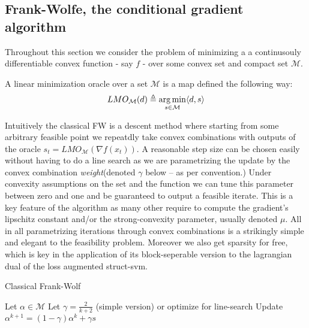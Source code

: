 \subsection{Frank-Wolfe, the conditional gradient algorithm}
Throughout this section we consider the problem of minimizing a
a continusouly differentiable convex function - say $f$ - over some convex set
and compact set $\mathcal M$.
\begin{definition}
  A linear minimization oracle over a set $\mathcal M$ is a map defined the following way:
  \begin{equation}
    LMO_{\mathcal{M}}(d) \triangleq \operatorname*{\arg\min}_{s \in\mathcal{M}}\langle d, s \rangle
    \label{eq:lmo}
  \end{equation}
\end{definition}


Intuitively the classical FW is a descent method where starting from some
arbitrary feasible point we repeatdly take convex combinations with outputs of
the oracle $s_{t}= LMO_{\mathcal{M}}(\nabla f(x_{t}))$. A reasonable step size
can be chosen easily without having to do a line search as we are parametrizing
the update by the convex combination \textit{weight}(denoted $\gamma$ below --
as per convention.) Under convexity assumptions on the set and the function we
can tune this parameter between zero and one and be guaranteed to output a
feasible iterate. This is a key feature of the algorithm as many other require
to compute the gradient's lipschitz constant and/or the strong-convexity
parameter, usually denoted $\mu$. All in all parametrizing iterations through
convex combinations is a strikingly simple and elegant to the feasibility
problem. Moreover we also get sparsity for free, which is key in the
application of its block-seperable version to the lagrangian dual of the
loss augmented struct-svm.

\begin{algorithm}[htbp!]
  \caption{Classical Frank-Wolf}
\begin{algorithmic}
   \STATE Let $\alpha\in\mathcal{M}$
   \STATE Let $\gamma = \frac{2}{k+2}$ (simple version) or optimize for line-search
   \STATE Update $\alpha^{k+1}= (1-\gamma)\alpha^{k}+ \gamma s$
   \ENDFOR
\end{algorithmic}
\end{algorithm}

